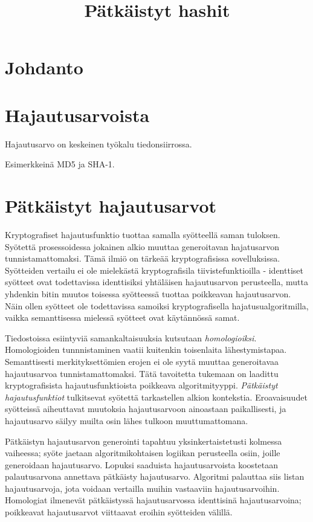 \documentclass{article}
\title{Pätkäistyt hashit}
\begin{document}
	\section*{Johdanto}

	\section*{Hajautusarvoista}

	Hajautusarvo on keskeinen työkalu tiedonsiirrossa.

	Esimerkkeinä MD5 ja SHA-1.

	\section*{Pätkäistyt hajautusarvot}

	Kryptografiset hajautusfunktio tuottaa samalla syötteellä saman tuloksen.
	Syö\-tettä prosessoidessa jokainen alkio muuttaa generoitavan hajatusarvon
	tunnistamattomaksi. Tämä ilmiö on tärkeää kryptografisissa sovelluksissa.
	Syötteiden vertailu ei ole mielekästä kryptografisila tiivistefunktioilla
	- identtiset syötteet ovat todettavissa identtisiksi yhtäläisen hajautusarvon perusteella, mutta yhdenkin bitin muutos toisessa syötteessä tuottaa poikkeavan hajautusarvon. Näin ollen syötteet ole todettavissa samoiksi kryptografisella hajatusualgoritmilla, vaikka semanttisessa mielessä syötteet ovat käytännössä samat.

	Tiedostoissa esiintyviä samankaltaisuuksia kutsutaan
	\textit{homologioiksi}. Homologioiden tunnnistaminen vaatii kuitenkin
	toisenlaita lähestymistapaa. Semanttisesti merkityksettömien erojen
	ei ole syytä muuttaa generoitavaa hajautusarvoa tunnistamattomaksi.
	Tätä tavoitetta tukemaan on laadittu kryptografisista hajautusfunktioista
	poikkeava algoritmityyppi. \textit{Pätkäistyt hajautusfunktiot} tulkitsevat
	syötettä tarkastellen alkion kontekstia. Eroavaisuudet syötteissä
	aiheuttavat muutoksia hajautusarvoon ainoastaan paikallisesti,
	ja hajautusarvo säilyy muilta osin lähes tulkoon muuttumattomana.

	Pätkäistyn hajautusarvon generointi tapahtuu yksinkertaistetusti
	kolmessa vaiheessa; syöte jaetaan algoritmikohtaisen logiikan
	perusteella osiin, joille generoidaan hajautusarvo. Lopuksi saaduista
	hajautusarvoista koostetaan palautusarvona annettava pätkäisty
	hajautusarvo. Algoritmi palauttaa siis listan hajautusarvoja, jota
	voidaan vertailla muihin vastaaviin hajautusarvoihin. Homologiat
	ilmenevät pätkäistyssä hajautusarvossa identtisinä hajautusarvoina;
	poikkeavat hajautusarvot viittaavat eroihin syötteiden välillä.
\end{document}
